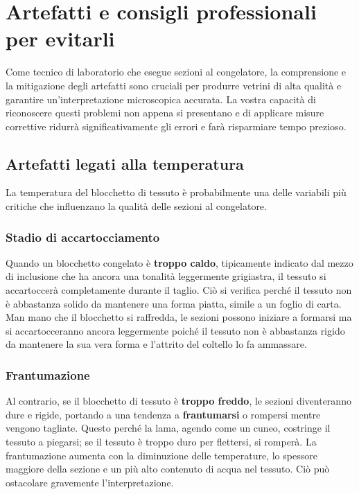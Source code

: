 \section{Artefatti e consigli professionali per evitarli}

Come tecnico di laboratorio che esegue sezioni al congelatore, la comprensione e la mitigazione degli artefatti sono cruciali per produrre vetrini di alta qualità e garantire un'interpretazione microscopica accurata.  La vostra capacità di riconoscere questi problemi non appena si presentano e di applicare misure correttive ridurrà significativamente gli errori e farà risparmiare tempo prezioso. 

\subsection{Artefatti legati alla temperatura}

La temperatura del blocchetto di tessuto è probabilmente una delle variabili più critiche che influenzano la qualità delle sezioni al congelatore. 

\subsubsection{Stadio di accartocciamento}
Quando un blocchetto congelato è \textbf{troppo caldo}, tipicamente indicato dal mezzo di inclusione che ha ancora una tonalità leggermente grigiastra, il tessuto si accartoccerà completamente durante il taglio.  Ciò si verifica perché il tessuto non è abbastanza solido da mantenere una forma piatta, simile a un foglio di carta.  Man mano che il blocchetto si raffredda, le sezioni possono iniziare a formarsi ma si accartocceranno ancora leggermente poiché il tessuto non è abbastanza rigido da mantenere la sua vera forma e l'attrito del coltello lo fa ammassare. 

\subsubsection{Frantumazione}
Al contrario, se il blocchetto di tessuto è \textbf{troppo freddo}, le sezioni diventeranno dure e rigide, portando a una tendenza a \textbf{frantumarsi} o rompersi mentre vengono tagliate.  Questo perché la lama, agendo come un cuneo, costringe il tessuto a piegarsi;  se il tessuto è troppo duro per flettersi, si romperà.  La frantumazione aumenta con la diminuzione delle temperature, lo spessore maggiore della sezione e un più alto contenuto di acqua nel tessuto. Ciò può ostacolare gravemente l'interpretazione. 

